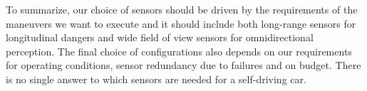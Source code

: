 To summarize, our choice of sensors should be driven by the requirements of the maneuvers we want to execute and it should include 
both long-range sensors for longitudinal dangers and wide field of view sensors for omnidirectional perception. 
The final choice of configurations also depends on our requirements for operating conditions, sensor redundancy due to failures and on budget. 
There is no single answer to which sensors are needed for a self-driving car. 

